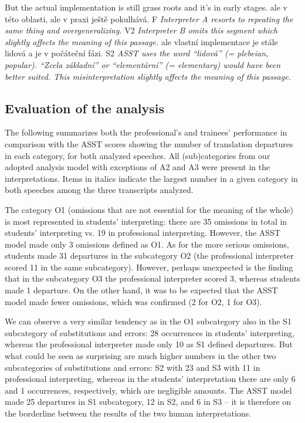 \documentclass[output=paper]{langscibook}
\begin{document}
\ea
  \ea
    \ea   But the actual implementation is still grass roots and it’s in early stages.
    \ex   ale v této oblasti, ale v praxi ještě pokulhává.
    \ex   F
    \ex   \textit{Interpreter A resorts to repeating the same thing and overgeneralizing.}
    \z
  \ex
    \ea
    \ex
    \ex   V2
    \z    \textit{Interpreter B omits this segment which slightly affects the meaning of this passage.}
  \ex
    \ea   ale vlastní implementace je stále lidová a je v počáteční fázi.
    \ex   S2
    \ex   \textit{ASST uses the word “lidová” (= plebeian, popular). “Zcela základní” or “elementární” (= elementary) would have been better suited. This misinterpretation slightly affects the meaning of this passage.}
    \z
  \z
\z

\subsection{Evaluation of the analysis}\label{sec:kloudova:4.3}

The following  summarizes both the professional’s and trainees’ performance in comparison with the ASST scores showing the number of translation departures in each category, for both analyzed speeches. All (sub)categories from our adopted analysis model with exceptions of A2 and A3 were present in the interpretations. Items in italics indicate the largest number in a given category in both speeches among the three transcripts analyzed.

The category O1 (omissions that are not essential for the meaning of the whole) is most represented in students’ interpreting: there are 35 omissions in total in students’ interpreting vs. 19 in professional interpreting. However, the ASST model made only 3 omissions defined as O1. As for the more serious omissions, students made 31 departures in the subcategory O2 (the professional interpreter scored 11 in the same subcategory). However, perhaps unexpected is the finding that in the subcategory O3 the professional interpreter scored 3, whereas students made 1 departure. On the other hand, it was to be expected that the ASST model made fewer omissions, which was confirmed (2 for O2, 1 for O3).

We can observe a very similar tendency as in the O1 subcategory also in the S1 subcategory of substitutions and errors: 28 occurrences in students’ interpreting, whereas the professional interpreter made only 10 as S1 defined departures. But what could be seen as surprising are much higher numbers in the other two subcategories of substitutions and errors: S2 with 23 and S3 with 11 in professional interpreting, whereas in the students’ interpretation there are only 6 and 1 occurrences, respectively, which are negligible amounts. The ASST model made 25 departures in S1 subcategory, 12 in S2, and 6 in S3 – it is therefore on the borderline between the results of the two human interpretations.
\end{document}
